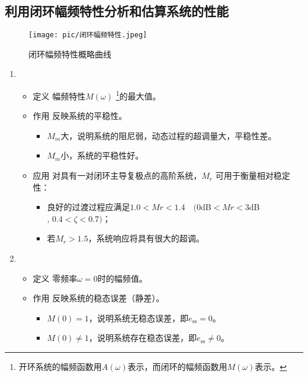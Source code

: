\subsection{利用闭环幅频特性分析和估算系统的性能}
\vspace*{-1.5em}
\begin{figure}[!htb]
	\centering
	\texttt{[image: pic/闭环幅频特性.jpeg]}
	\vspace*{-2em}
	\caption{闭环幅频特性概略曲线}
	\vspace*{-1em}
	\label{闭环幅频特性}
\end{figure}
\begin{enumerate}[1. ]
		\item {}
			\begin{itemize}
				\item 定义 \quad 幅频特性$M(\omega)$
				\footnote[1]{开环系统的幅频函数用$A(\omega)$表示，而闭环的幅频函数用$M(\omega)$表示。}的最大值。
				\item 作用 \quad 反映系统的平稳性。
				\begin{itemize}
					\item $M_m$大，说明系统的阻尼弱，动态过程的超调量大，平稳性差。
					\item $M_m$小，系统的平稳性好。
				\end{itemize}
				\item 应用 \quad 对具有一对闭环主导复极点的高阶系统，$M_r$ 可用于衡量相对稳定性：
				\begin{itemize}
					\item 良好的过渡过程应满足$1.0<Mr<1.4\quad (0$dB$<Mr<3$dB$, \,0.4 <\zeta < 0.7)$；
					\item 若$M_r>1.5$，系统响应将具有很大的超调。
				\end{itemize}
			\end{itemize}
		
		\item {}
			\begin{itemize}
				\item 定义 \quad 零频率$\omega = 0$时的幅频值。
				\item 作用 \quad 反映系统的稳态误差（静差）。
				\begin{itemize}
					\item $M(0) = 1$，说明系统无稳态误差，即$e_{\text{ss}} = 0$。
					\item $M(0) \neq 1$，说明系统存在稳态误差，即$e_{\text{ss}} \neq 0$。
				\end{itemize}
			\end{itemize}
		

\end{enumerate}
